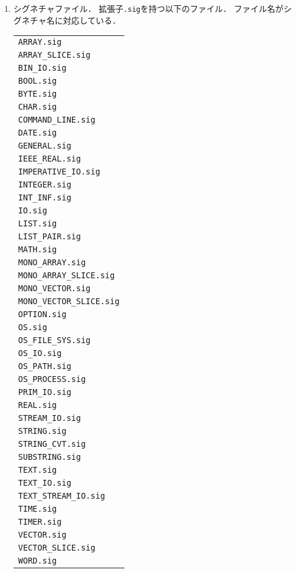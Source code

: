 \documentclass{jbook}
\newcommand{\code}[1]{\mbox{\large\tt #1}}
\begin{document}
\begin{enumerate}
\item シグネチャファイル．
	拡張子\code{.sig}を持つ以下のファイル．
	ファイル名がシグネチャ名に対応している．

\begin{tabular}{l}
\code{ARRAY.sig}\\
\code{ARRAY\_SLICE.sig}\\
\code{BIN\_IO.sig}\\
\code{BOOL.sig}\\
\code{BYTE.sig}\\
\code{CHAR.sig}\\
\code{COMMAND\_LINE.sig}\\
\code{DATE.sig}\\
\code{GENERAL.sig}\\
\code{IEEE\_REAL.sig}\\
\code{IMPERATIVE\_IO.sig}\\
\code{INTEGER.sig}\\
\code{INT\_INF.sig}\\
\code{IO.sig}\\
\code{LIST.sig}\\
\code{LIST\_PAIR.sig}\\
\code{MATH.sig}\\
\code{MONO\_ARRAY.sig}\\
\code{MONO\_ARRAY\_SLICE.sig}\\
\code{MONO\_VECTOR.sig}\\
\code{MONO\_VECTOR\_SLICE.sig}\\
\code{OPTION.sig}\\
\code{OS.sig}\\
\code{OS\_FILE\_SYS.sig}\\
\code{OS\_IO.sig}\\
\code{OS\_PATH.sig}\\
\code{OS\_PROCESS.sig}\\
\code{PRIM\_IO.sig}\\
\code{REAL.sig}\\
\code{STREAM\_IO.sig}\\
\code{STRING.sig}\\
\code{STRING\_CVT.sig}\\
\code{SUBSTRING.sig}\\
\code{TEXT.sig}\\
\code{TEXT\_IO.sig}\\
\code{TEXT\_STREAM\_IO.sig}\\
\code{TIME.sig}\\
\code{TIMER.sig}\\
\code{VECTOR.sig}\\
\code{VECTOR\_SLICE.sig}\\
\code{WORD.sig}
\end{tabular}


\end{enumerate}
\end{document}

